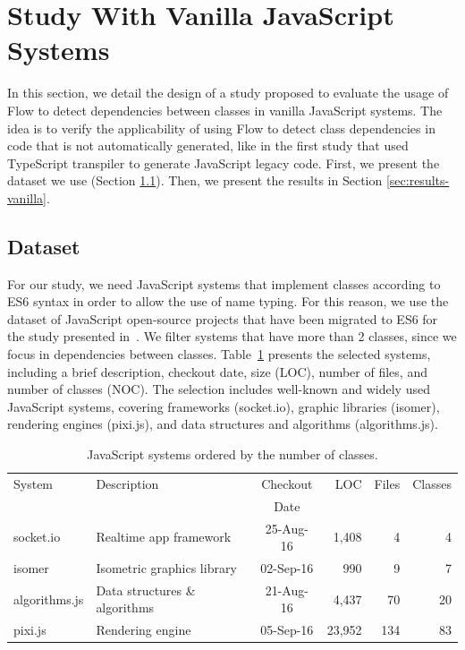 \documentclass[review]{elsarticle}
\begin{document}
\section{Study With Vanilla JavaScript Systems}
\label{sec:study-design-vanilla}

In this section, we detail the design of a study proposed to evaluate the usage of Flow to detect dependencies between classes in vanilla JavaScript systems. The idea is to verify the applicability of using Flow to detect class dependencies in code that is not automatically generated, like in the first study that used TypeScript transpiler to generate JavaScript legacy code. First, we present the dataset we use (Section \ref{sec:dataset-vanilla}). Then, we present the results in Section \ref{sec:results-vanilla}.

\subsection{Dataset}
\label{sec:dataset-vanilla}

For our study, we need JavaScript systems that implement classes according to ES6 syntax in order to allow the use of name typing. For this reason, we use the dataset of JavaScript open-source projects that have been migrated to ES6 for the study presented in~\cite{icsr2017}. We filter systems that have more than 2 classes, since we focus in dependencies between classes. Table~\ref{tab:dataset-vanilla} presents the selected systems, including a brief description, checkout date, size (LOC), number of files, and number of classes (NOC). The selection includes well-known and widely used JavaScript systems, covering frameworks ({\sc socket.io}), graphic libraries ({\sc isomer}), rendering engines ({\sc pixi.js}), and data structures and algorithms ({\sc algorithms.js}). 

\begin{table}%
	\footnotesize
	\centering
	\caption{JavaScript systems ordered by the number of classes.}
	\begin{tabular}{llcrrr}
		\toprule
		System              & Description                    & Checkout  & LOC    & Files & Classes   \\
		&                                & Date      &        &          &                      \\
		\midrule
		{\sc socket.io}     & Realtime app framework         & 25-Aug-16 &  1,408 &      4 &        4    \\  
		{\sc isomer}        & Isometric graphics library     & 02-Sep-16 &    990 &      9 &        7   \\  
		{\sc algorithms.js} & Data structures \& algorithms  & 21-Aug-16 &  4,437 &     70 &       20   \\  
		{\sc pixi.js}       & Rendering engine               & 05-Sep-16 & 23,952 &    134 &       83   \\ 
		\bottomrule
	\end{tabular}
	\label{tab:dataset-vanilla}
\end{table}
\end{document}
